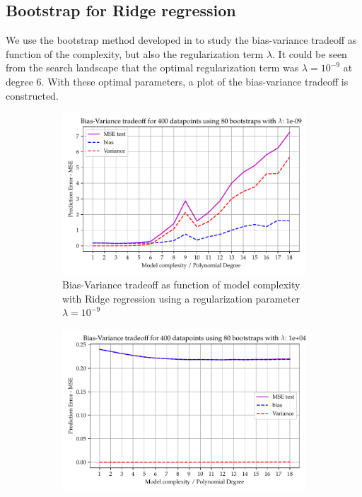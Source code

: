 \documentclass[11pt, a4paper]{article}
\begin{document}
\subsection*{Bootstrap for Ridge regression}
We use the bootstrap method developed in  to study the bias-variance tradeoff as function of the complexity, but also the regularization term $\lambda$. It could be seen from the search landscape that the optimal regularization term was $\lambda = 10^{-9}$ at degree 6. With these optimal parameters, a plot of the bias-variance tradeoff is constructed.

\begin{figure}
  \centering
  \begin{subfigure}{0.49\textwidth}
    \centering
    \includegraphics[width=\textwidth]{figures/EX4_ridge_complexity_using_bootstrap_function_lmb200.pdf}
    \caption{\label{fig:ridge_beta_1}Bias-Variance tradeoff as function of model complexity with Ridge regression using a regularization parameter $\lambda = 10^{-9}$}
  \end{subfigure}
  \hfill
  \begin{subfigure}{0.49\textwidth}
    \centering
    \includegraphics[width=\textwidth]{figures/EX4_ridge_complexity_using_bootstrap_function_lmb2013.pdf}

\end{subfigure}
\end{figure}
\end{document}
